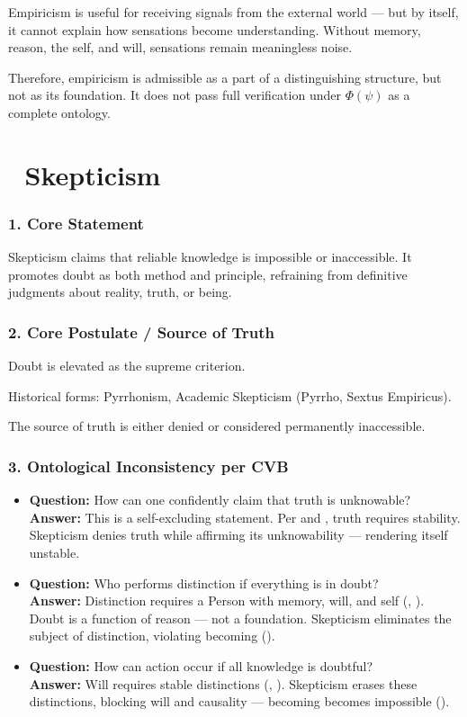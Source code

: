 \documentclass[12pt]{article}
\begin{document}
Empiricism is useful for receiving signals from the external world — but by itself, it cannot explain how sensations become understanding. Without memory, reason, the self, and will, sensations remain meaningless noise.

Therefore, empiricism is admissible as a part of a distinguishing structure, but not as its foundation. It does not pass full verification under $\Phi(\psi)$ as a complete ontology.


\section*{🔷 Skepticism}

\subsubsection*{1. Core Statement}

Skepticism claims that reliable knowledge is impossible or inaccessible. It promotes doubt as both method and principle, refraining from definitive judgments about reality, truth, or being.

\subsubsection*{2. Core Postulate / Source of Truth}

Doubt is elevated as the supreme criterion.

Historical forms: Pyrrhonism, Academic Skepticism (Pyrrho, Sextus Empiricus).

The source of truth is either denied or considered permanently inaccessible.

\subsubsection*{3. Ontological Inconsistency per CVB}

\begin{itemize}
\item \textbf{Question:} How can one confidently claim that truth is unknowable?  
\\ \textbf{Answer:} This is a self-excluding statement. Per \text{[11.1.1]} and \text{[11.2]}, truth requires stability. Skepticism denies truth while affirming its unknowability — rendering itself unstable.

\item \textbf{Question:} Who performs distinction if everything is in doubt?  
\\ \textbf{Answer:} Distinction requires a Person with memory, will, and self (\text{[9]}, \text{[12]}). Doubt is a function of reason — not a foundation. Skepticism eliminates the subject of distinction, violating becoming (\text{[7]}).

\item \textbf{Question:} How can action occur if all knowledge is doubtful?  
\\ \textbf{Answer:} Will requires stable distinctions (\text{[10.6]}, \text{[11.8]}). Skepticism erases these distinctions, blocking will and causality — becoming becomes impossible (\text{[7]}).
\end{itemize}
\end{document}
